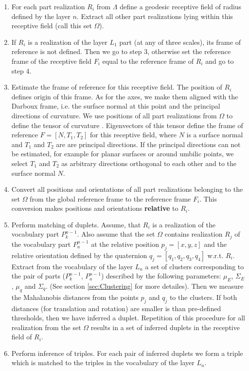 \documentclass[runningheads]{llncs}
\begin{document}
\begin{enumerate}

\item For each part realization $R_i$ from $\Lambda$ define a geodesic receptive
field of radius defined by the layer $n$. Extract all other part
realizations lying within this receptive field (call this set
$\Omega$).

\item If $R_i$ is a realization of the layer $L_1$ part (at any of three scales), its frame of reference is not defined.
Then we go to step 3, otherwise set the reference frame of the
receptive field $F_i$ equal to the reference frame of $R_i$ and go
to step 4.

\item Estimate the frame of reference for this receptive field. The position of $R_i$ defines origin of this
frame. As for the axes, we make them aligned with the Darboux frame,
i.e. the surface normal at this point and the principal directions
of curvature. We use positions of all part realizations from
$\Omega$ to define the tensor of curvature
\cite{taubin1995estimating}. Eigenvectors of this tensor define the
frame of reference $F = [N, T_1, T_2]$ for this receptive field,
where $N$ is a surface normal and $T_1$ and $T_2$ are are principal
directions. If the principal directions can not be estimated, for
example for planar surfaces or around umbilic points, we select
$T_1$ and $T_2$ as arbitrary directions orthogonal to each other and
to the surface normal $N$.

\item Convert all positions and orientations of all part realizations
belonging to the set $\Omega$ from the global reference frame to the
reference frame $F_i$. This conversion makes positions and
orientations \textbf{relative} to $R_i$.

\item Perform matching of duplets. Assume, that $R_i$ is a
realization of the vocabulary part $P_k^{n-1}$. Also assume that the
set $\Omega$ contains realization $R_j$ of the vocabulary part
$P_a^{n-1}$ at the relative position $p_j = [x,y,z]$ and the
relative orientation defined by the quaternion $q_j = [q_1, q_2,
q_3, q_4]$ w.r.t. $R_i$. Extract from the vocabulary of the layer
$L_n$ a set of clusters corresponding to the pair of parts
($P_k^{n-1}$, $P_a^{n-1}$) described by the following parameters:
$\mu_E$, $\Sigma_E$, $\mu_q$ and $\Sigma_q$. (See section
\ref{sec:Clustering} for more detailes). Then we measure the
Mahalanobis distances from the points $p_j$ and $q_j$ to the
clusters. If both distances (for translation and rotation) are
smaller is than pre-defined thresholds, then we have inferred a
duplet. Repetition of this procedure for all realization from the
set $\Omega$ results in a set of inferred duplets in the receptive
field of $R_i$.

\item Perform inference of triples. For each pair of inferred duplets we form a triple which is matched to the
triples in the vocabulary of the layer $L_n$.


\end{enumerate}
\end{document}
